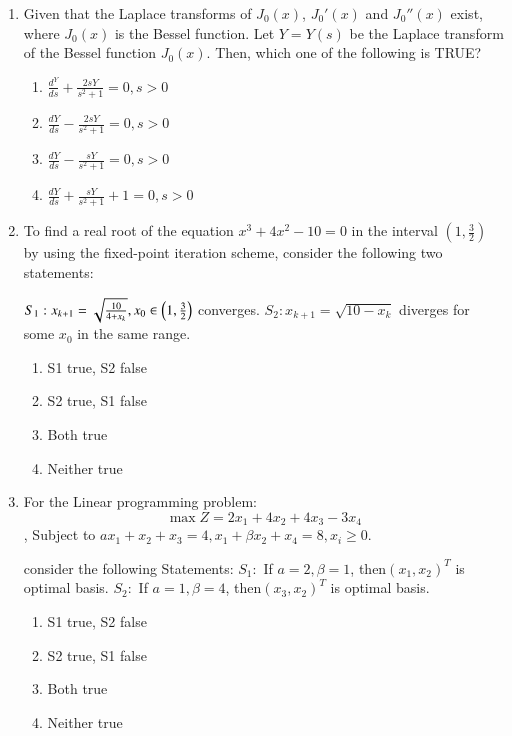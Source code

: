 \documentclass[journal,12pt,onecolumn]{IEEEtran}
\theoremstyle{remark}
\begin{document}
\begin{enumerate}
\item Given that the Laplace transforms of $J_0(x)$, $J_0'(x)$ and $J_0{''}(x)$ exist, where $J_0(x)$ is the Bessel function. Let $Y = Y(s)$ be the Laplace transform of the Bessel function $J_0(x)$. Then, which one of the following is TRUE?

\begin{enumerate}
\item $\frac{d^Y}{ds} + \frac{2sY}{s^2+1} = 0, s>0$  
\item $\frac{dY}{ds} - \frac{2sY}{s^2+1}=0, s>0$  
\item $\frac{dY}{ds} - \frac{sY}{s^2+1}=0, s>0$  
\item $\frac{dY}{ds} + \frac{sY}{s^2+1} + 1=0, s>0$  
\end{enumerate}
\hfill{}

\item To find a real root of the equation $x^3+4x^2-10=0$ in the interval $(1,\frac{3}{2})$ by using the fixed-point iteration scheme, consider the following two statements:

$S_1: x_{k+1}=\sqrt{\tfrac{10}{4+x_k}}, x_0\in \left(1,\tfrac32\right)$ converges.  
$S_2: x_{k+1}=\sqrt{10-x_k}$ diverges for some $x_0$ in the same range.

\begin{enumerate}
\item S1 true, S2 false  
\item S2 true, S1 false  
\item Both true  
\item Neither true  
\end{enumerate}
\hfill{}

\item For the Linear programming problem: $$\max Z=2x_1+4x_2+4x_3-3x_4$$, 
Subject to $ax_1+x_2+x_3=4, x_1+\beta x_2+x_4=8, x_i\ge0$.

consider the following Statements:  
$S_1:$ If $a=2,\beta=1$, then$(x_1,x_2)^T$ is optimal basis.  
$S_2:$ If $a=1,\beta=4$, then$(x_3,x_2)^T$ is optimal basis.

\begin{enumerate}
\item S1 true, S2 false  
\item S2 true, S1 false  
\item Both true  
\item Neither true  
\end{enumerate}
\hfill{}


\end{enumerate}
\end{document}
